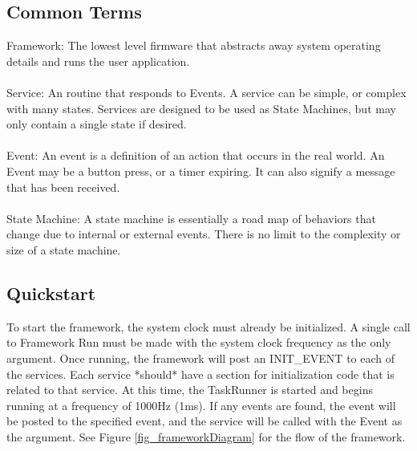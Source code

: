 \documentclass[12pt compsoc]{article}
\begin{document}
\subsection{Common Terms}
Framework: The lowest level firmware that abstracts away system operating details and runs the user application.
\\\\
Service: An routine that responds to Events. A service can be simple, or complex with many states. Services are designed to be used as State Machines, but may only contain a single state if desired.
\\\\
Event: An event is a definition of an action that occurs in the real world. An Event may be a button press, or a timer expiring. It can also signify a message that has been received.
\\\\
State Machine: A state machine is essentially a road map of behaviors that change due to internal or external events. There is no limit to the complexity or size of a state machine.

\subsection{Quickstart}

 To start the  framework, the system clock must already be initialized. A single call to Framework Run must be made with the system clock frequency as the only argument. Once running, the framework will post an INIT\_EVENT to each of the services. Each service *should* have a section for initialization code that is related to that service. At this time, the TaskRunner is started and begins running at a frequency of 1000Hz (1ms). If any events are found, the event will be posted to the specified event, and the service will be called with the Event as the argument. See Figure \ref{fig_frameworkDiagram} for the flow of the framework.
 
\end{document}
